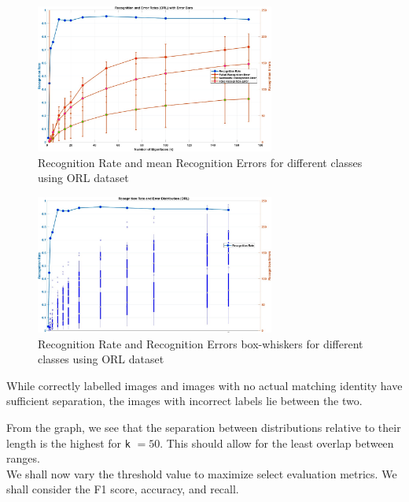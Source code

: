 \documentclass{article}
\begin{document}
\begin{figure}[!htb]
    \centering
    \includegraphics[width=0.7\textwidth]{simple_plot.jpg}
    \caption{Recognition Rate and mean Recognition Errors for different classes using ORL dataset}
\end{figure}
\begin{figure}[!htb]
    \centering
    \includegraphics[width=0.7\textwidth]{box_plot.jpg}
    \caption{Recognition Rate and Recognition Errors box-whiskers for different classes using ORL dataset}
\end{figure}

While correctly labelled images and images with no actual matching identity have sufficient separation, the images with incorrect labels lie between the two. 

From the graph, we see that the separation between distributions relative to their length is the highest for \texttt{k} $= 50$. This should allow for the least overlap between ranges. 
\\
We shall now vary the threshold value to maximize select evaluation metrics. We shall consider the F1 score, accuracy, and recall.
\end{document}
